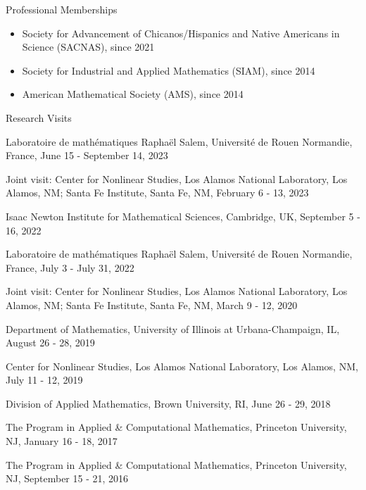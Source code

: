 \documentclass[10pt]{article} %
\newenvironment{outerlist}[1][\enskip\textbullet]%
        {\begin{itemize}[#1]}{\end{itemize}%
         \vspace{-.6\baselineskip}}
\newenvironment{innerlist}[1][\enskip\textbullet]%
        {\begin{compactitem}[#1]}{\end{compactitem}}
\begin{document}
\begin{section}{Professional Memberships}
\begin{outerlist}
\item \vskip -7mm
Society for Advancement of Chicanos/Hispanics and Native Americans in Science (SACNAS), since 2021
\item Society for Industrial and Applied Mathematics (SIAM), since 2014
\item American Mathematical Society (AMS), since 2014
\end{outerlist}

\end{section}

\begin{section}{Research Visits} 
\begin{innerlist}
\setlength\itemsep{1em}
\item \vskip -4.3mm 
Laboratoire de math\'ematiques Rapha\"el Salem, Universit\'e de Rouen Normandie, France, June 15 - September 14, 2023
\item Joint visit: Center for Nonlinear Studies, Los Alamos National Laboratory, Los Alamos, NM;
Santa Fe Institute, Santa Fe, NM, February 6 - 13, 2023
\item Isaac Newton Institute for Mathematical Sciences, Cambridge, UK, September 5 - 16, 2022
\item Laboratoire de math\'ematiques Rapha\"el Salem, Universit\'e de Rouen Normandie, France, July 3 - July 31, 2022
\item Joint visit: Center for Nonlinear Studies, Los Alamos National Laboratory, Los Alamos, NM; 
Santa Fe Institute, Santa Fe, NM, March 9 - 12, 2020
\item Department of Mathematics, University of Illinois at Urbana-Champaign, IL, August 26 - 28, 2019
\item Center for Nonlinear Studies, Los Alamos National Laboratory, Los Alamos, NM, July 11 - 12, 2019 
\item Division of Applied Mathematics, Brown University, RI, June 26 - 29, 2018
\item The Program in Applied \& Computational Mathematics, Princeton University, NJ, January 16 - 18, 2017 
\item The Program in Applied \& Computational Mathematics, Princeton University, NJ, September 15 - 21, 2016 

\end{innerlist}
\end{section}
\end{document}
